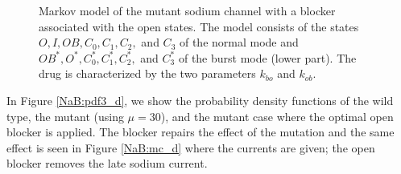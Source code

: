 \begin{figure}[ptb]
\begin{center}
\end{center}
\caption{Markov model of the mutant sodium channel with a blocker associated
with the open states. The model consists of the states $O,I,OB,C_{0}
,C_{1},C_{2},$ and $C_{3}$ of the normal mode and $OB^*,O^{*},C^{*}_{0},C^{*}
_{1},C^{*}_{2},$ and $C^{*}_{3}$ of the burst mode (lower part). The drug is
characterized by the two parameters $k_{bo}$ and $k_{ob}$.}
\label{burstdrg}
\end{figure}

\newpage



In Figure \ref{NaB:pdf3_d}, we show the probability density functions of the wild type, the mutant (using $\mu=30$), and
the mutant case where the optimal open blocker is applied. The blocker repairs the effect of the mutation and the same effect is seen in Figure \ref{NaB:mc_d} where the currents are given; the open blocker removes the late sodium current.


